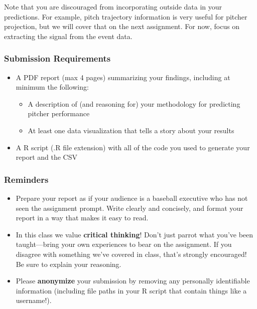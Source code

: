 \documentclass{article}
\begin{document}
      Note that you are discouraged from incorporating outside data in your predictions. For example, pitch trajectory information is very useful for pitcher projection, but we will cover that on the next assignment. For now, focus on extracting the signal from the event data.

      \subsubsection*{\sc Submission Requirements}

        \begin{itemize}
          \item A PDF report (max 4 pages) summarizing your findings, including at minimum the following:
          \begin{itemize}
            \item A description of (and reasoning for) your methodology for predicting pitcher performance
            \item At least one data visualization that tells a story about your results
          \end{itemize}
          \item A R script (.R file extension) with all of the code you used to generate your report and the CSV
        \end{itemize}

      \subsubsection*{\sc Reminders}

        \begin{itemize}
          \item Prepare your report as if your audience is a baseball executive who has not seen the assignment prompt. Write clearly and concisely, and format your report in a way that makes it easy to read.
          \item In this class we value {\bf critical thinking}! Don't just parrot what you've been taught---bring your own experiences to bear on the assignment. If you disagree with something we've covered in class, that's strongly encouraged! Be sure to explain your reasoning.
          \item Please {\bf anonymize} your submission by removing any personally identifiable information (including file paths in your R script that contain things like a username!).
        \end{itemize}
\end{document}

